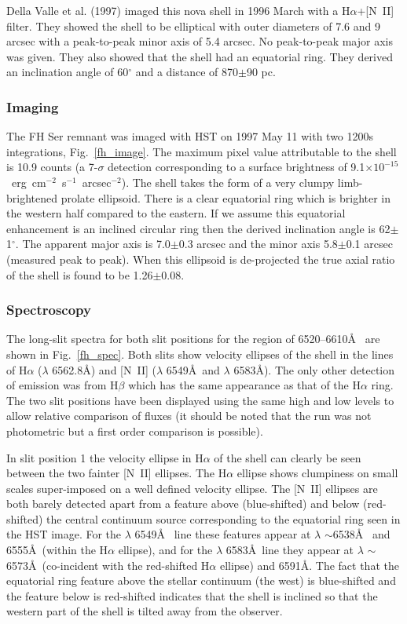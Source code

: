 Della Valle et al. (1997) imaged this nova shell in 1996 March with a
H$\alpha$+[N~II] filter. They showed the shell to be elliptical with
outer diameters of 7.6 and 9 arcsec with a peak-to-peak minor axis of 5.4
arcsec. No peak-to-peak major axis was given. They also showed that the
shell had an equatorial ring. They derived an inclination angle of
60$^\circ$ and a distance of 870$\pm$90 pc.

\subsubsection{Imaging}
The FH Ser remnant was imaged with HST on 1997 May 11 with two 1200s
integrations, Fig.~\ref{fh_image}.  The maximum pixel value
attributable to the shell is 10.9 counts (a 7-$\sigma$ detection 
corresponding to a surface
brightness of 9.1$\times
10^{-15}$~erg~cm$^{-2}$~s$^{-1}$~arcsec$^{-2}$).
The shell takes the form
of a very clumpy limb-brightened prolate ellipsoid. There is a clear
equatorial ring which is brighter in the western half compared to the
eastern. If we assume this equatorial enhancement is an inclined
circular ring then the derived inclination angle is
62$\pm$1$^\circ$. The apparent major axis is 7.0$\pm$0.3 arcsec and
the minor axis 5.8$\pm$0.1 arcsec (measured peak to peak).  When this
ellipsoid is de-projected the true axial ratio of the shell is found
to be 1.26$\pm$0.08.

\subsubsection{Spectroscopy}
The long-slit spectra for both slit positions for the region of
6520--6610\AA~ are shown in Fig.~\ref{fh_spec}. 
Both slits show velocity ellipses of the shell in the lines of
H$\alpha$ ($\lambda$ 6562.8\AA) and
[N~II] ($\lambda$ 6549\AA~and $\lambda$ 6583\AA). 
The only other detection
of emission was from H$\beta$ which has the same appearance as that of the
H$\alpha$ ring. The two slit positions have been displayed using the same
high and low levels to allow relative comparison of fluxes (it should be
noted that the run was not photometric but a first order comparison is
possible). 

In slit position 1 the velocity ellipse in H$\alpha$ of the shell can
clearly be seen between the two fainter [N~II] ellipses. The H$\alpha$
ellipse shows clumpiness on small scales super-imposed on a well
defined velocity ellipse.  The [N~II] ellipses are both barely
detected apart from a feature above (blue-shifted) and below (red-shifted)
the central continuum source
corresponding to the equatorial ring seen in the HST image.  For the
$\lambda$ 6549\AA~ line these features appear at
$\lambda$ $\sim$6538\AA~ and 6555\AA~(within the H$\alpha$ ellipse),
and for the $\lambda$ 6583\AA~line they appear at
$\lambda$ $\sim$6573\AA~(co-incident with the red-shifted H$\alpha$
ellipse) and 6591\AA. The fact that the equatorial ring feature above
the stellar continuum (the west) is blue-shifted and the feature below
is red-shifted indicates that the shell is inclined so that the western
part of the shell is tilted away from the observer.

